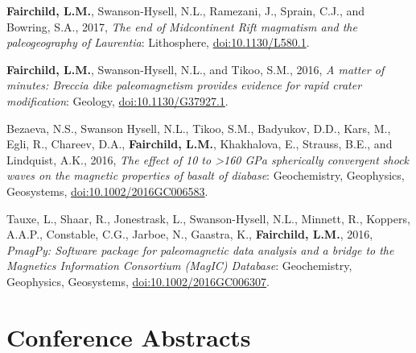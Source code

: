 \documentclass[11pt,letterpaper,sans]{moderncv}
\begin{document}
\begin{etaremune}[itemsep=3pt]
 \item{\textbf{Fairchild, L.M.}, Swanson-Hysell, N.L., Ramezani, J., Sprain,
             C.J., and Bowring, S.A., 2017, \textit{The end of Midcontinent Rift
              magmatism and the paleogeography of Laurentia}: Lithosphere,
             {\color{cyan}\href{https://doi.org/10.1130/L580.1}
               {doi:10.1130/L580.1}}.}

 \item{\textbf{Fairchild, L.M.}, Swanson-Hysell, N.L., and Tikoo, S.M., 2016,
             \textit{A matter of minutes: Breccia dike paleomagnetism provides
              evidence for rapid crater modification}: Geology,
             {\color{cyan}\href{https://doi.org/10.1130/G37927.1}
               {doi:10.1130/G37927.1}}.}

 \item{Bezaeva, N.S., Swanson Hysell, N.L., Tikoo, S.M., Badyukov, D.D.,
             Kars, M., Egli, R., Chareev, D.A., \textbf{Fairchild, L.M.},
             Khakhalova, E., Strauss, B.E., and Lindquist, A.K., 2016,
             \textit{The effect of 10 to >160 GPa spherically convergent shock
              waves on the magnetic properties of basalt of diabase}:
             Geochemistry, Geophysics, Geosystems,
             {\color{cyan}\href{https://doi.org/10.1002/2016GC006583}
               {doi:10.1002/2016GC006583}}.}

 \item{Tauxe, L., Shaar, R., Jonestrask, L., Swanson-Hysell, N.L., Minnett,
             R., Koppers, A.A.P., Constable, C.G., Jarboe, N., Gaastra,  K.,
             \textbf{Fairchild, L.M.}, 2016, \textit{PmagPy: Software package for
              paleomagnetic data analysis and a bridge to the Magnetics
              Information Consortium (MagIC) Database}: Geochemistry,
             Geophysics, Geosystems,
             {\color{cyan}\href{https://doi.org/10.1002/2016GC006307}
               {doi:10.1002/2016GC006307}}.}

\end{etaremune}

\section{Conference Abstracts}
\end{document}
